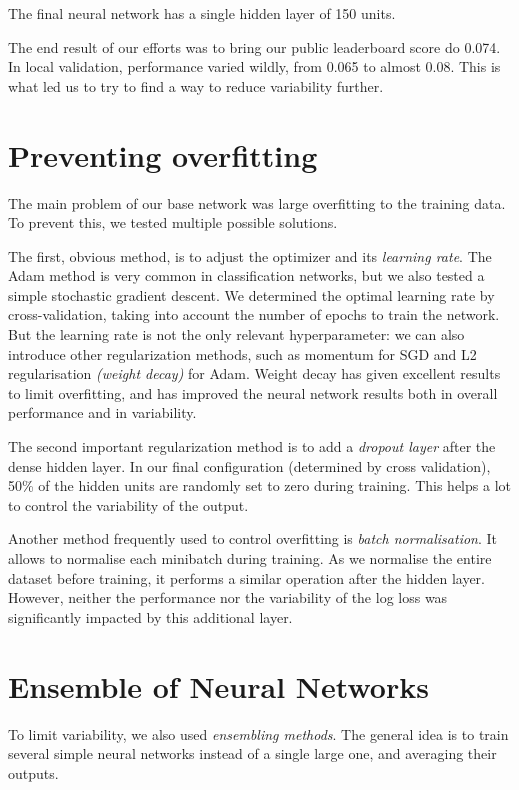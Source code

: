 \documentclass[a4paper,11pt,openany,extrafontsizes,oneside,article,twocolumn]{memoir}
\begin{document}
The final neural network has a single hidden layer of 150 units.

The end result of our efforts was to bring our public leaderboard
score do 0.074. In local validation, performance varied wildly, from
0.065 to almost 0.08. This is what led us to try to find a way to
reduce variability further.

\section{Preventing overfitting}

The main problem of our base network was large overfitting to the
training data. To prevent this, we tested multiple possible solutions.

The first, obvious method, is to adjust the optimizer and its
\emph{learning rate}. The Adam method is very common in classification
networks, but we also tested a simple stochastic gradient descent. We
determined the optimal learning rate by cross-validation, taking into
account the number of epochs to train the network. But the learning
rate is not the only relevant hyperparameter: we can also introduce
other regularization methods, such as momentum for SGD and L2
regularisation \emph{(weight decay)} for Adam. Weight decay has given
excellent results to limit overfitting, and has improved the neural
network results both in overall performance and in variability.

The second important regularization method is to add a \emph{dropout
  layer} after the dense hidden layer. In our final configuration
(determined by cross validation), 50\% of the hidden units are
randomly set to zero during training. This helps a lot to control the
variability of the output.

Another method frequently used to control overfitting is \emph{batch
  normalisation}. It allows to normalise each minibatch during
training. As we normalise the entire dataset before training, it
performs a similar operation after the hidden layer. However, neither
the performance nor the variability of the log loss was significantly
impacted by this additional layer.

\section{Ensemble of Neural Networks}

To limit variability, we also used \emph{ensembling methods}. The
general idea is to train several simple neural networks instead of a
single large one, and averaging their outputs.
\end{document}
